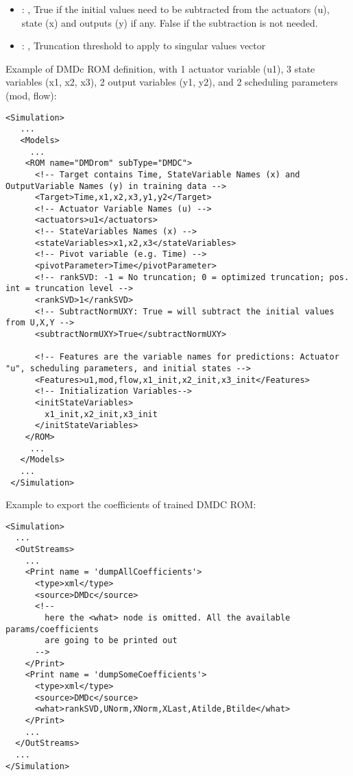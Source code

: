 \begin{itemize}
    \item {}: , 
      True if the initial values need to be subtracted from the
      actuators (u), state (x) and outputs (y) if any. False if the subtraction
      is not needed.

    \item {}: , 
      Truncation threshold to apply to singular values vector
  \end{itemize}

\hspace{24pt}
Example of DMDc ROM definition, with 1 actuator variable (u1), 3 state variables (x1, x2, x3), 2 output variables (y1, y2), and 2 scheduling parameters (mod, flow):
\begin{lstlisting}[style=XML,morekeywords={name,subType}]
<Simulation>
   ...
   <Models>
     ...
    <ROM name="DMDrom" subType="DMDC">
      <!-- Target contains Time, StateVariable Names (x) and OutputVariable Names (y) in training data -->
      <Target>Time,x1,x2,x3,y1,y2</Target>
      <!-- Actuator Variable Names (u) -->
      <actuators>u1</actuators>
      <!-- StateVariables Names (x) -->
      <stateVariables>x1,x2,x3</stateVariables>
      <!-- Pivot variable (e.g. Time) -->
      <pivotParameter>Time</pivotParameter>
      <!-- rankSVD: -1 = No truncation; 0 = optimized truncation; pos. int = truncation level -->
      <rankSVD>1</rankSVD>
      <!-- SubtractNormUXY: True = will subtract the initial values from U,X,Y -->
      <subtractNormUXY>True</subtractNormUXY>

      <!-- Features are the variable names for predictions: Actuator "u", scheduling parameters, and initial states -->
      <Features>u1,mod,flow,x1_init,x2_init,x3_init</Features>
      <!-- Initialization Variables-->
      <initStateVariables>
        x1_init,x2_init,x3_init
      </initStateVariables>
    </ROM>
     ...
   </Models>
   ...
 </Simulation>

\end{lstlisting}

Example to export the coefficients of trained DMDC ROM:
\begin{lstlisting}[style=XML,morekeywords={name,subType}]
<Simulation>
  ...
  <OutStreams>
    ...
    <Print name = 'dumpAllCoefficients'>
      <type>xml</type>
      <source>DMDc</source>
      <!--
        here the <what> node is omitted. All the available params/coefficients
        are going to be printed out
      -->
    </Print>
    <Print name = 'dumpSomeCoefficients'>
      <type>xml</type>
      <source>DMDc</source>
      <what>rankSVD,UNorm,XNorm,XLast,Atilde,Btilde</what>
    </Print>
    ...
  </OutStreams>
  ...
</Simulation>
\end{lstlisting}
